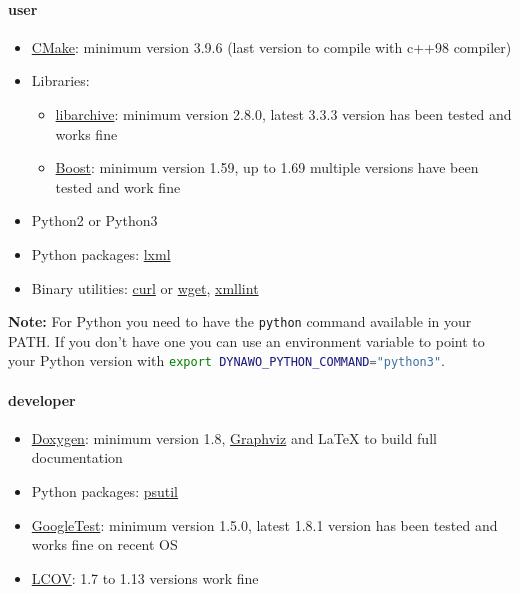 \documentclass[a4paper, 12pt]{report}
\begin{document}
\paragraph{\Dynawo user}

\begin{itemize}
\item
  \href{https://cmake.org/}{CMake}: minimum version 3.9.6 (last version
  to compile with c++98 compiler)
\item
  Libraries:

  \begin{itemize}
  \item
    \href{https://www.libarchive.org/}{libarchive}: minimum version
    2.8.0, latest 3.3.3 version has been tested and works fine
  \item
    \href{https://www.boost.org/}{Boost}: minimum version 1.59, up to
    1.69 multiple versions have been tested and work fine
  \end{itemize}

\item
  Python2 or Python3
\item
  Python packages: \href{https://lxml.de/}{lxml}
\item
  Binary utilities: \href{https://curl.haxx.se/}{curl} or
  \href{https://www.gnu.org/software/wget/}{wget},
  \href{http://xmlsoft.org/xmllint.html}{xmllint}
\end{itemize}

\textbf{Note:} For Python you need to have the \lstinline[language=bash]{python} command available in your PATH. If you don't have one you can use an environment variable to point to your Python version with \lstinline[language=bash]{export DYNAWO_PYTHON_COMMAND="python3"}.

\paragraph{\Dynawo developer}

\begin{itemize}
\item
  \href{http://www.doxygen.nl/}{Doxygen}: minimum version 1.8,
  \href{https://graphviz.readthedocs.io/en/stable/}{Graphviz} and LaTeX
  to build full documentation
\item
  Python packages:
  \href{https://psutil.readthedocs.io/en/latest/}{psutil}
\item
  \href{https://github.com/google/googletest}{GoogleTest}: minimum
  version 1.5.0, latest 1.8.1 version has been tested and works fine on
  recent OS
\item
  \href{http://ltp.sourceforge.net/coverage/lcov.php}{LCOV}: 1.7 to 1.13
  versions work fine
\end{itemize}
\end{document}
